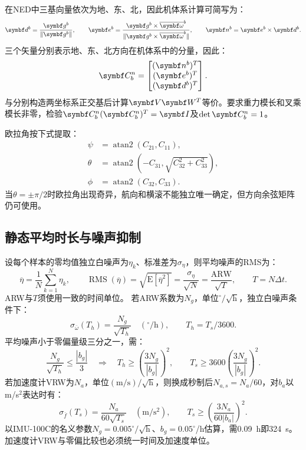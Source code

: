 在NED中三基向量依次为地、东、北，因此机体系计算可简写为：
\begin{equation}
\matr d^b=\frac{\matr g^b}{\|\matr g^b\|},\qquad
\matr e^b=\frac{\matr g^b\times\overline{\matr\omega}^b}{\|\matr g^b\times\overline{\matr\omega}^b\|},\qquad
\matr n^b=\matr e^b\times\matr d^b.
\label{eq:triad}\end{equation}
三个矢量分别表示地、东、北方向在机体系中的分量，因此：
\begin{equation}
\matr C_b^n=\begin{bmatrix}(\matr n^b)^T\\(\matr e^b)^T\\(\matr d^b)^T\end{bmatrix}.
\end{equation}
与分别构造两坐标系正交基后计算$\matr V\matr W^T$等价。要求重力模长和叉乘模长非零，检验$\matr C_b^n(\matr C_b^n)^T=\matr I$及$\det\matr C_b^n=1$。

欧拉角按下式提取：
\begin{equation}
\begin{aligned}
\psi&=\operatorname{atan2}(C_{21},C_{11}),\\
\theta&=\operatorname{atan2}(-C_{31},\sqrt{C_{32}^2+C_{33}^2}),\\
\phi&=\operatorname{atan2}(C_{32},C_{33}).
\end{aligned}\label{eq:euler}\end{equation}
当$\theta=\pm\pi/2$时欧拉角出现奇异，航向和横滚不能独立唯一确定，但方向余弦矩阵仍可使用。


\subsection{静态平均时长与噪声抑制}
设每个样本的零均值独立白噪声为$\eta_k$、标准差为$\sigma_\eta$，则平均噪声的RMS为：
\begin{equation}
\overline\eta=\frac1N\sum_{k=1}^N\eta_k,\qquad
\operatorname{RMS}(\overline\eta)=\sqrt{\mathrm E[\overline\eta^2]}
=\frac{\sigma_\eta}{\sqrt N}=\frac{\mathrm{ARW}}{\sqrt T},\qquad T=N\Delta t.
\label{eq:noiseaverage}\end{equation}
ARW与$T$须使用一致的时间单位。
若ARW系数为$N_g$，单位$^\circ/\sqrt{\mathrm h}$，独立白噪声条件下：
\begin{equation}
\sigma_{\overline\omega}(T_h)=\frac{N_g}{\sqrt{T_h}}\quad(^\circ/\mathrm h),\qquad T_h=T_s/3600.
\end{equation}
平均噪声小于零偏量级三分之一，需：
\begin{equation}
\frac{N_g}{\sqrt{T_h}}\le\frac{|b_g|}{3}
\quad\Longrightarrow\quad T_h\ge\left(\frac{3N_g}{|b_g|}\right)^2,\qquad
T_s\ge3600\left(\frac{3N_g}{|b_g|}\right)^2.
\label{eq:averagetime}
\end{equation}
若加速度计VRW为$N_a$，单位$(\mathrm{m/s})/\sqrt{\mathrm h}$，则换成秒制后$N_{a,s}=N_a/60$，对$b_a$以m/s$^2$表达时有：
\begin{equation}
\sigma_{\overline f}(T_s)=\frac{N_a}{60\sqrt{T_s}}\quad(\mathrm{m/s^2}),\qquad
T_s\ge\left(\frac{3N_a}{60|b_a|}\right)^2.
\end{equation}
以IMU-100C的名义参数$N_g=0.005^\circ/\sqrt{\mathrm h}$、$b_g=0.05^\circ$/h估算，需0.09~h即324~s。加速度计VRW与零偏比较也必须统一时间及加速度单位。
